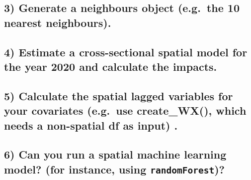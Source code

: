\documentclass[
  letterpaper,
  DIV=11,
  numbers=noendperiod]{scrreprt}
\begin{document}
\hypertarget{generate-a-neighbours-object-e.g.-the-10-nearest-neighbours.}{%
\subsection*{3) Generate a neighbours object (e.g.~the 10 nearest
neighbours).}\label{generate-a-neighbours-object-e.g.-the-10-nearest-neighbours.}}

\hypertarget{estimate-a-cross-sectional-spatial-model-for-the-year-2020-and-calculate-the-impacts.}{%
\subsection*{4) Estimate a cross-sectional spatial model for the year
2020 and calculate the
impacts.}\label{estimate-a-cross-sectional-spatial-model-for-the-year-2020-and-calculate-the-impacts.}}

\hypertarget{calculate-the-spatial-lagged-variables-for-your-covariates-e.g.-use-create_wx-which-needs-a-non-spatial-df-as-input-.}{%
\subsection*{5) Calculate the spatial lagged variables for your
covariates (e.g.~use create\_WX(), which needs a non-spatial df as
input)
.}\label{calculate-the-spatial-lagged-variables-for-your-covariates-e.g.-use-create_wx-which-needs-a-non-spatial-df-as-input-.}}

\hypertarget{can-you-run-a-spatial-machine-learning-model-for-instance-using-randomforest}{%
\subsection*{\texorpdfstring{6) Can you run a spatial machine learning
model? (for instance, using
\texttt{randomForest})?}{6) Can you run a spatial machine learning model? (for instance, using randomForest)?}}\label{can-you-run-a-spatial-machine-learning-model-for-instance-using-randomforest}}
\end{document}
